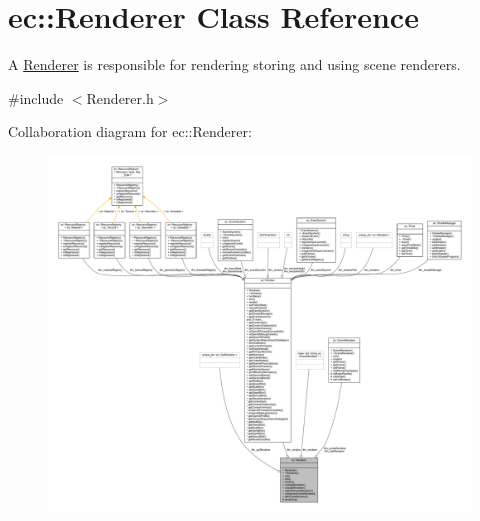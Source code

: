 \hypertarget{classec_1_1_renderer}{}\section{ec\+:\+:Renderer Class Reference}
\label{classec_1_1_renderer}


A \mbox{\hyperlink{classec_1_1_renderer}{Renderer}} is responsible for rendering storing and using scene renderers.  




{\ttfamily \#include $<$Renderer.\+h$>$}



Collaboration diagram for ec\+:\+:Renderer\+:\nopagebreak
\begin{figure}[H]
\begin{center}
\leavevmode
\includegraphics[width=350pt]{classec_1_1_renderer__coll__graph}
\end{center}
\end{figure}
